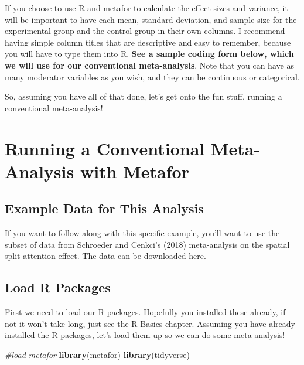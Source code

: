 \documentclass[
]{book}
\newenvironment{Shaded}{\begin{snugshade}}{\end{snugshade}}
\newcommand{\CommentTok}[1]{\textcolor[rgb]{0.56,0.35,0.01}{\textit{#1}}}
\newcommand{\FunctionTok}[1]{\textcolor[rgb]{0.13,0.29,0.53}{\textbf{#1}}}
\newcommand{\NormalTok}[1]{#1}
\begin{document}
If you choose to use R and metafor to calculate the effect sizes and variance, it will be important to have each mean, standard deviation, and sample size for the experimental group and the control group in their own columns. I recommend having simple column titles that are descriptive and easy to remember, because you will have to type them into R. \textbf{See a sample coding form below, which we will use for our conventional meta-analysis}. Note that you can have as many moderator variables as you wish, and they can be continuous or categorical.

So, assuming you have all of that done, let's get onto the fun stuff, running a conventional meta-analysis!

\hypertarget{running-a-conventional-meta-analysis-with-metafor}{%
\section{Running a Conventional Meta-Analysis with Metafor}\label{running-a-conventional-meta-analysis-with-metafor}}

\hypertarget{example-data-for-this-analysis}{%
\subsection{Example Data for This Analysis}\label{example-data-for-this-analysis}}

If you want to follow along with this specific example, you'll want to use the subset of data from Schroeder and Cenkci's (2018)\citep{schroeder2018} meta-analysis on the spatial split-attention effect. The data can be \href{https://github.com/noah-schroeder/reviewbook/blob/abfdb439ef81267b388ef75067a03262e1e59020/SC\%20sample\%20data.csv}{downloaded here}.

\hypertarget{load-r-packages}{%
\subsection{Load R Packages}\label{load-r-packages}}

First we need to load our R packages. Hopefully you installed these already, if not it won't take long, just see the \protect\hyperlink{rbasics}{R Basics chapter}. Assuming you have already installed the R packages, let's load them up so we can do some meta-analysis!

\begin{Shaded}
\begin{Highlighting}[]
\CommentTok{\#load metafor}
\FunctionTok{library}\NormalTok{(metafor)}
\FunctionTok{library}\NormalTok{(tidyverse)}
\end{Highlighting}
\end{Shaded}
\end{document}
